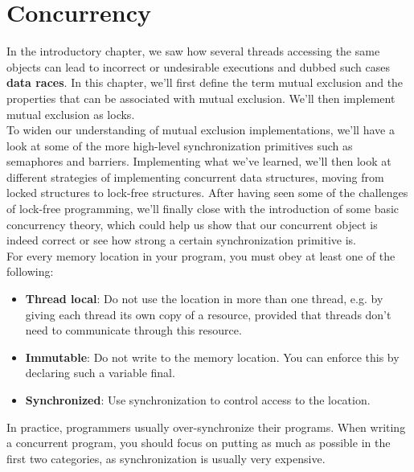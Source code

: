 \documentclass[main]{subfiles}
\begin{document}
\section{Concurrency}
In the introductory chapter, we saw how several threads accessing the same objects can lead to incorrect or undesirable executions and dubbed such cases \textbf{data races}. In this chapter, we'll first define the term mutual exclusion and the properties that can be associated with mutual exclusion. We'll then implement mutual exclusion as locks.\\
To widen our understanding of mutual exclusion implementations, we'll have a look at some of the more high-level synchronization primitives such as semaphores and barriers. Implementing what we've learned, we'll then look at different strategies of implementing concurrent data structures, moving from locked structures to lock-free structures. After having seen some of the challenges of lock-free programming, we'll finally close with the introduction of some basic concurrency theory, which could help us show that our concurrent object is indeed correct or see how strong a certain synchronization primitive is.\\[3mm]
For every memory location in your program, you must obey at least one of the following:
\begin{itemize}
    \item \textbf{Thread local}: Do not use the location in more than one thread, e.g. by giving each thread its own copy of a resource, provided that threads don't need to communicate through this resource.
    \item \textbf{Immutable}: Do not write to the memory location. You can enforce this by declaring such a variable final.
    \item \textbf{Synchronized}: Use synchronization to control access to the location.
\end{itemize}
In practice, programmers usually over-synchronize their programs. When writing a concurrent program, you should focus on putting as much as possible in the first two categories, as synchronization is usually very expensive.


\end{document}

